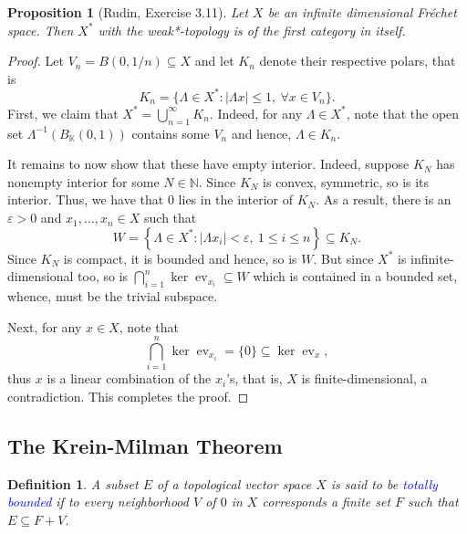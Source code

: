 \documentclass[11pt]{article}
\theoremstyle{thmstyle}
\newtheorem{proposition}[theorem]{Proposition}
\theoremstyle{defstyle}
\newtheorem{definition}[theorem]{Definition}
\newcommand{\R}{\mathbb{R}}
\newcommand{\N}{\mathbb{N}}
\newcommand{\bbC}{\mathbb{C}}
\newcommand{\K}{\mathbb{K}} %
\newcommand{\ev}{\operatorname{ev}}
\newcommand{\define}[1]{\textcolor{blue}{\textit{#1}}}
\renewcommand{\le}{\leqslant}
\begin{document}
\begin{proposition}[Rudin, Exercise 3.11]
    Let $X$ be an infinite dimensional Fr\'echet space. Then $X^\ast$ with the weak*-topology is of the first category in itself.
\end{proposition}
\begin{proof}
    Let $V_n = B(0, 1/n)\subseteq X$ and let $K_n$ denote their respective polars, that is 
    \begin{equation*}
        K_n = \{\Lambda\in X^\ast\colon |\Lambda x|\le 1,~\forall x\in V_n\}.
    \end{equation*}
    First, we claim that $\displaystyle X^\ast = \bigcup_{n = 1}^\infty K_n$. Indeed, for any $\Lambda\in X^\ast$, note that the open set $\Lambda^{-1}(B_{\K}(0, 1))$ contains some $V_n$ and hence, $\Lambda\in K_n$.

    It remains to now show that these have empty interior. Indeed, suppose $K_N$ has nonempty interior for some $N\in\N$. Since $K_N$ is convex, symmetric, so is its interior. Thus, we have that $0$ lies in the interior of $K_N$. As a result, there is an $\varepsilon > 0$ and $x_1,\dots, x_n\in X$ such that 
    \begin{equation*}
        W = \left\{\Lambda\in X^\ast\colon |\Lambda x_i| < \varepsilon,~1\le i\le n\right\}\subseteq K_N.
    \end{equation*}
    Since $K_N$ is compact, it is bounded and hence, so is $W$. But since $X^\ast$ is infinite-dimensional too, so is $\bigcap_{i = 1}^n\ker\ev_{x_i}\subseteq W$ which is contained in a bounded set, whence, must be the trivial subspace.

    Next, for any $x\in X$, note that 
    \begin{equation*}
        \bigcap_{i = 1}^n \ker\ev_{x_i} = \{0\}\subseteq\ker\ev_x,
    \end{equation*}
    thus $x$ is a linear combination of the $x_i$'s, that is, $X$ is finite-dimensional, a contradiction. This completes the proof.
\end{proof}

\subsection{The Krein-Milman Theorem}

\begin{definition}
    A subset $E$ of a topological vector space $X$ is said to be \define{totally bounded} if to every neighborhood $V$ of $0$ in $X$ corresponds a finite set $F$ such that $E\subseteq F + V$.
\end{definition}
\end{document}
